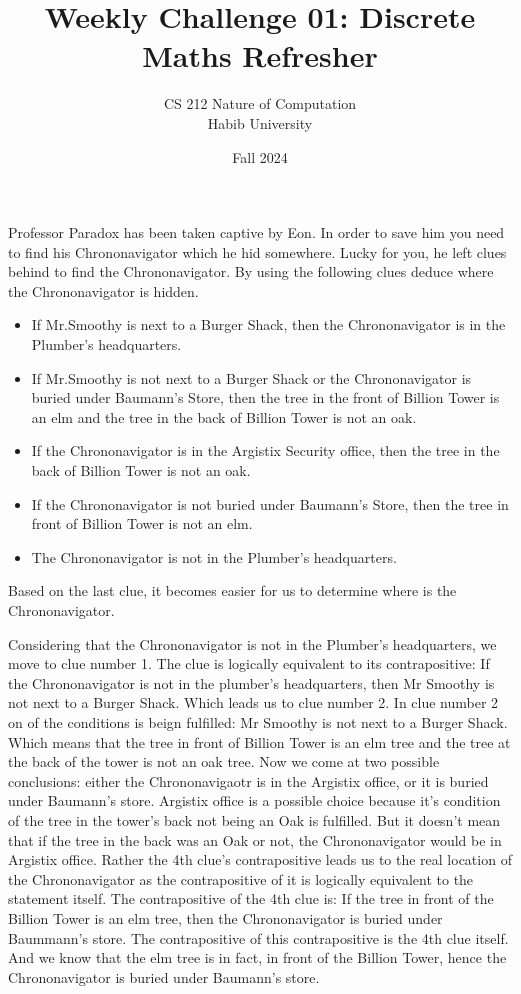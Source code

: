 \documentclass[a4paper]{exam}
\title{Weekly Challenge 01: Discrete Maths Refresher}
\author{CS 212 Nature of Computation\\Habib University}
\date{Fall 2024}
\begin{document}
\maketitle

\begin{questions}
  
Professor Paradox has been taken captive by Eon. In order to save him you need to find his Chrononavigator which he hid somewhere.
Lucky for you, he left clues behind to find the Chrononavigator. By using the following clues deduce where the Chrononavigator is hidden.
\begin{itemize}
    \item If Mr.Smoothy is next to a Burger Shack, then the Chrononavigator is in the Plumber's headquarters.
    \item If Mr.Smoothy is not next to a Burger Shack or the Chrononavigator is buried under Baumann's Store, then the tree in the front of Billion Tower is an elm and the tree in the back of Billion Tower is not an oak.
    \item If the Chrononavigator is in the Argistix Security office, then the tree in the back of Billion Tower is not an oak.
    \item If the Chrononavigator is not buried under Baumann's Store, then the tree in front of Billion Tower is not an elm.
    \item The Chrononavigator is not in the Plumber's headquarters.
\end{itemize}

\begin{solution}
    Based on the last clue, it becomes easier for us to determine where is the Chrononavigator. 

    Considering that the Chrononavigator is not in the Plumber's headquarters, we move to clue number 1. The clue is logically equivalent to its contrapositive: If the Chrononavigator is not in the plumber's headquarters, then Mr Smoothy is not next to a Burger Shack. Which leads us to clue number 2. In clue number 2 on of the conditions is beign fulfilled: Mr Smoothy is not next to a Burger Shack. Which means that the tree in front of Billion Tower is an elm tree and the tree at the back of the tower is not an oak tree. Now we come at two possible conclusions: either the Chrononavigaotr is in the Argistix office, or it is buried under Baumann's store. Argistix office is a possible choice because it's condition of the tree in the tower's back not being an Oak is fulfilled. But it doesn't mean that if the tree in the back was an Oak or not, the Chrononavigator would be in Argistix office. Rather the 4th clue's contrapositive leads us to the real location of the Chrononavigator as the contrapositive of it is logically equivalent to the statement itself. The contrapositive of the 4th clue is: If the tree in front of the Billion Tower is an elm tree, then the Chrononavigator is buried under Baummann's store. The contrapositive of this contrapositive is the 4th clue itself. And we know that the elm tree is in fact, in front of the Billion Tower, hence the Chrononavigator is buried under Baumann's store.
\end{solution}


\end{questions}
\end{document}
